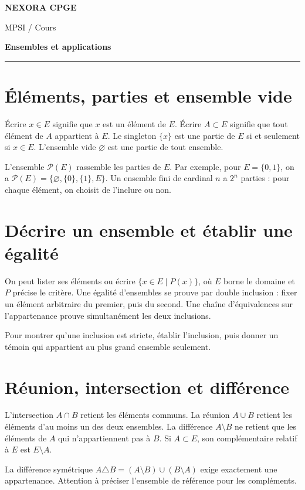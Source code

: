 \documentclass[11pt,a4paper]{article}
\begin{document}
{\small\bfseries\color{nexorablue} NEXORA CPGE}\par
{\small MPSI / Cours}\par
{\LARGE\bfseries Ensembles et applications}\par
\vspace{0.25em}\hrule\vspace{0.6em}

\section*{Éléments, parties et ensemble vide}
Écrire $x\in E$ signifie que $x$ est un élément de $E$. Écrire $A\subset E$ signifie que tout élément de $A$ appartient à $E$. Le singleton $\{x\}$ est une partie de $E$ si et seulement si $x\in E$. L’ensemble vide $\varnothing$ est une partie de tout ensemble.

L’ensemble $\mathcal P(E)$ rassemble les parties de $E$. Par exemple, pour $E=\{0,1\}$, on a $\mathcal P(E)=\{\varnothing,\{0\},\{1\},E\}$. Un ensemble fini de cardinal $n$ a $2^n$ parties : pour chaque élément, on choisit de l’inclure ou non.

\section*{Décrire un ensemble et établir une égalité}
On peut lister ses éléments ou écrire $\{x\in E\mid P(x)\}$, où $E$ borne le domaine et $P$ précise le critère. Une égalité d’ensembles se prouve par double inclusion : fixer un élément arbitraire du premier, puis du second. Une chaîne d’équivalences sur l’appartenance prouve simultanément les deux inclusions.

Pour montrer qu’une inclusion est stricte, établir l’inclusion, puis donner un témoin qui appartient au plus grand ensemble seulement.

\section*{Réunion, intersection et différence}
L’intersection $A\cap B$ retient les éléments communs. La réunion $A\cup B$ retient les éléments d’au moins un des deux ensembles. La différence $A\setminus B$ ne retient que les éléments de $A$ qui n’appartiennent pas à $B$. Si $A\subset E$, son complémentaire relatif à $E$ est $E\setminus A$.

La différence symétrique $A\triangle B=(A\setminus B)\cup(B\setminus A)$ exige exactement une appartenance. Attention à préciser l’ensemble de référence pour les compléments.
\end{document}
